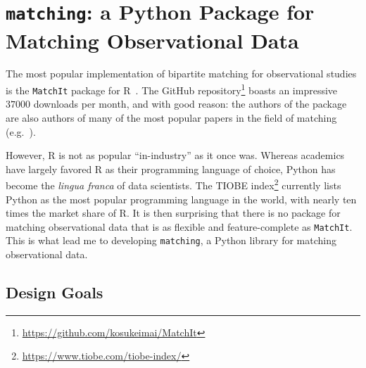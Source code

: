 \documentclass[11pt]{extarticle}
\begin{document}
\section{\texttt{matching}: a Python Package for Matching Observational Data}

The most popular implementation of bipartite matching for observational studies is the \texttt{MatchIt} package for R~\parencite{ho_matchit_2011}.
The GitHub repository\footnote{\url{https://github.com/kosukeimai/MatchIt}} boasts an impressive $37000$ downloads per month, and with good reason: the authors of the package are also authors of many of the most popular papers in the field of matching (e.g.~\textcite{ho_matching_2007, imai_causal_2004, king_why_2019, stuart_matching_2010}).

However, R is not as popular ``in-industry'' as it once was. Whereas academics have largely favored R as their programming language of choice, Python has become the \emph{lingua franca} of data scientists. The TIOBE index\footnote{\url{https://www.tiobe.com/tiobe-index/}} currently lists Python as the most popular programming language in the world, with nearly ten times the market share of R.
It is then surprising that there is no package for matching observational data that is as flexible and feature-complete as \texttt{MatchIt}. This is what lead me to developing \texttt{matching}, a Python library for matching observational data.

\subsection{Design Goals}
\end{document}
